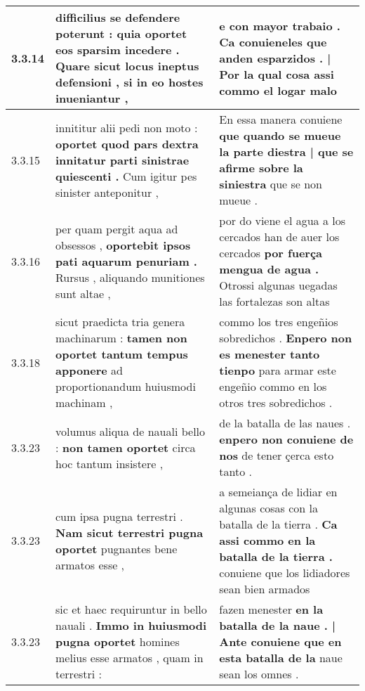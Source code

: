 \begin{tabular}{|p{1cm}|p{6.5cm}|p{6.5cm}|}
3.3.14 & difficilius se defendere poterunt : \textbf{ quia oportet eos sparsim incedere . Quare sicut locus ineptus defensioni , } si in eo hostes inueniantur , & e con mayor trabaio . \textbf{ Ca conuieneles que anden esparzidos . | Por la qual cosa } assi commo el logar malo \\\hline
3.3.15 & innititur alii pedi non moto : \textbf{ oportet quod pars dextra innitatur parti sinistrae quiescenti . } Cum igitur pes sinister anteponitur , & En essa manera conuiene \textbf{ que quando se mueue la parte diestra | que se afirme sobre la siniestra } que se non mueue . \\\hline
3.3.16 & per quam pergit aqua ad obsessos , \textbf{ oportebit ipsos pati aquarum penuriam . } Rursus , aliquando munitiones sunt altae , & por do viene el agua a los cercados han de auer los cercados \textbf{ por fuerça mengua de agua . } Otrossi algunas uegadas las fortalezas son altas \\\hline
3.3.18 & sicut praedicta tria genera machinarum : \textbf{ tamen non oportet tantum tempus apponere } ad proportionandum huiusmodi machinam , & commo los tres engeñios sobredichos . \textbf{ Enpero non es menester tanto tienpo } para armar este engeñio commo en los otros tres sobredichos . \\\hline
3.3.23 & volumus aliqua de nauali bello : \textbf{ non tamen oportet } circa hoc tantum insistere , & de la batalla de las naues . \textbf{ enpero non conuiene de nos } de tener çerca esto tanto . \\\hline
3.3.23 & cum ipsa pugna terrestri . \textbf{ Nam sicut terrestri pugna oportet } pugnantes bene armatos esse , & a semeiança de lidiar en algunas cosas con la batalla de la tierra . \textbf{ Ca assi commo en la batalla de la tierra . } conuiene que los lidiadores sean bien armados \\\hline
3.3.23 & sic et haec requiruntur in bello nauali . \textbf{ Immo in huiusmodi pugna oportet } homines melius esse armatos , quam in terrestri : & fazen menester \textbf{ en la batalla de la naue . | Ante conuiene que en esta batalla de la } naue sean los omnes . \\\hline

\end{tabular}
